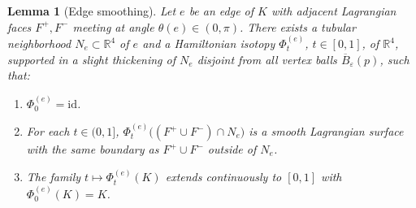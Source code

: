 \documentclass[12pt]{article}
\newtheorem{lemma}[theorem]{Lemma}
\theoremstyle{definition}
\begin{document}
\begin{lemma}[Edge smoothing]\label{lem:edge}
Let $e$ be an edge of $K$ with adjacent Lagrangian faces $F^+,F^-$ meeting at angle $\theta(e)\in(0,\pi)$. There exists a tubular neighborhood $N_e\subset\mathbb{R}^4$ of $e$ and a Hamiltonian isotopy $\Phi_t^{(e)}$, $t\in[0,1]$, of $\mathbb{R}^4$, supported in a slight thickening of $N_e$ disjoint from all vertex balls $\overline{B}_\varepsilon(p)$, such that:
\begin{enumerate}
\item $\Phi_0^{(e)}=\mathrm{id}$.
\item For each $t\in(0,1]$, $\Phi_t^{(e)}\bigl((F^+\cup F^-)\cap N_e\bigr)$ is a smooth Lagrangian surface with the same boundary as $F^+\cup F^-$ outside of $N_e$.
\item The family $t\mapsto\Phi_t^{(e)}(K)$ extends continuously to $[0,1]$ with $\Phi_0^{(e)}(K)=K$.
\end{enumerate}
\end{lemma}
\end{document}
